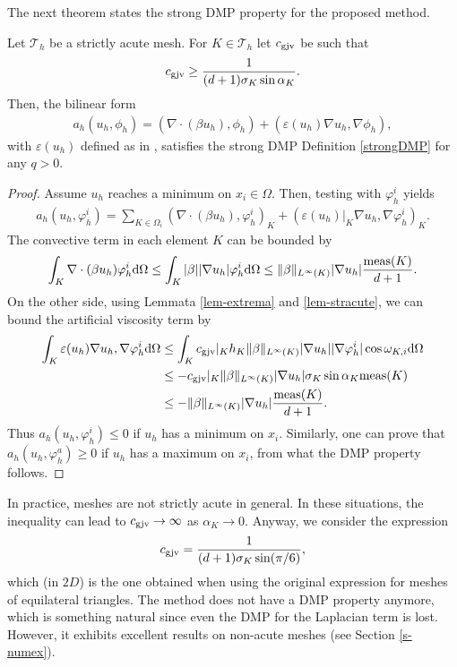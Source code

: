 The next theorem states the strong DMP property for the proposed method.
\begin{theorem}
Let $\mathcal{T}_h$ be a strictly acute mesh. For $K\in \mathcal{T}_h$ let $c_{\rm gjv}$ be such that 
\begin{align}\label{eq-cgjv1}
c_{\rm gjv} \geq \frac{1}{(d+1) \sigma_K \sin \alpha_K}.
\end{align}
Then, the bilinear form
\begin{align}\label{eq-bfgjv}
a_h(u_h,\phi_h) = (\nabla \cdot ( \beta u_h), \phi_h) + (\varepsilon(u_h) \nabla u_h, \nabla \phi_h), 
\end{align}
with $\varepsilon(u_h)$ defined as in , satisfies  the strong DMP Definition \ref{strongDMP}  for any $q>0$.
\end{theorem}
\begin{proof}
Assume $u_h$ reaches a minimum on $x_i\in\Omega$. Then, testing  with $\varphi_h^i$ yields
\begin{align*}
 a_h(u_h,\varphi_h^i) = \sum\limits_{K\in\Omega_i} (\nabla \cdot  (\beta u_h), \varphi_h^i)_K + 
 (\varepsilon(u_h)|_K \nabla u_h, \nabla \varphi_h^i)_K.
\end{align*}
The convective term in each element $K$ can be bounded by
\begin{align*}
\int_K \nabla \cdot (\beta  u_h) \varphi_h^i {\rm d}\Omega \leq \int_K |\beta| |\nabla u_h| \varphi_h^i {\rm d}\Omega \leq \|\beta\|_{L^\infty(K)} |\nabla u_h| \frac{{\rm meas}(K)}{d+1}.
\end{align*}
On the other side, using Lemmata \ref{lem-extrema} and \ref{lem-stracute}, we can bound the artificial viscosity term by
\begin{align*}
\int_K \varepsilon(u_h) \nabla u_h, \nabla \varphi^i_h {\rm d}\Omega &  \leq \int_K c_{\rm gjv}|_K h_K \|\beta\|_{L^\infty(K)} |\nabla u_h| |\nabla \varphi_h^i| \cos \omega_{K,i}{\rm d}\Omega\\
&  \leq - c_{\rm gjv}|_K \|\beta\|_{L^\infty(K)} |\nabla u_h| \sigma_K \sin \alpha_K  {\rm meas}(K) \\
& \leq - \|\beta\|_{L^\infty(K)} |\nabla u_h| \frac{{\rm meas}(K)}{d+1}.
\end{align*}
Thus $a_h(u_h,\varphi_h^i) \leq 0$ if $u_h$ has a minimum on $x_i$. Similarly, one can prove that $a_h(u_h,\varphi_h^a) \geq 0$ if $u_h$ has a maximum on $x_i$, from what the DMP property follows.
\end{proof}


In practice, meshes are not strictly acute in general. In these situations, the inequality  can lead to $c_{\rm gjv} \to \infty$ as $\alpha_K \to 0$. Anyway, we consider the expression 
\begin{align*}%
c_{\rm gjv} = \frac{1}{(d+1) \sigma_K \sin (\pi/6)},
\end{align*}
which (in $2D$) is the one obtained when using the original expression for meshes of equilateral triangles. The method does not have a DMP property anymore, which is something natural since even the DMP for the Laplacian term is lost. However, it exhibits excellent results on non-acute meshes (see Section \ref{s-numex}).

